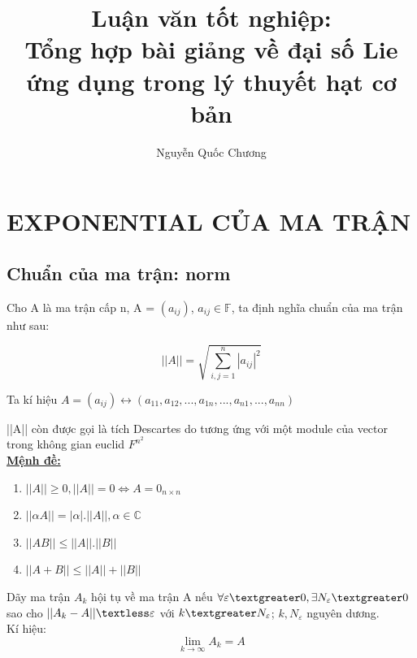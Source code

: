 \documentclass{report}
\title{\textbf{Luận văn tốt nghiệp:\\Tổng hợp bài giảng về đại số Lie ứng dụng trong lý thuyết hạt cơ bản}}
\author{Nguyễn Quốc Chương}
\begin{document}

\begin{titlepage}
		\maketitle
\end{titlepage}

\tableofcontents

\setcounter{page}{1}

\chapter{EXPONENTIAL CỦA MA TRẬN}

\section{Chuẩn của ma trận: norm}
	
Cho A là ma trận cấp n, A = \((a_{ij}) \), \(a_{ij} \in \mathbb{F} \), ta định nghĩa chuẩn của ma trận như sau:

\[ ||A|| = \sqrt{ \sum_{i, j=1}^n |a_{ij}|^{2} } \]

Ta kí hiệu \( A = (a_{ij}) \leftrightarrow ( a_{11}, a_{12}, ..., a_{1n}, ..., a_{n1}, ..., a_{nn} ) \) 

||A|| còn được gọi là tích Descartes do tương ứng với một module của vector trong không gian euclid \( F^{n^{2}} \)\\

\textbf{\underline{Mệnh đề:}}

	\begin{enumerate}
 		\item \( ||A|| \geq 0, ||A|| = 0 \Leftrightarrow A = 0_{n \times n} \)
 		\item \( ||\alpha A|| = |\alpha |.||A||, \alpha \in \mathbb{C} \)
 		\item \( ||AB|| \leq ||A||.||B|| \)
 		\item \( ||A + B|| \leq ||A|| + ||B|| \)
	\end{enumerate}

Dãy ma trận \( A_{k} \) hội tụ về ma trận A nếu \( \forall \varepsilon \textgreater 0, \exists N_{ \varepsilon } \textgreater 0 \) sao cho \( || A_{k} - A || \textless \varepsilon \) với \( k \textgreater N_{ \varepsilon}\);  \(k, N_{\varepsilon} \) nguyên dương.\\

Kí hiệu: \[ \lim_{k \to \infty} A_{k} = A \] 
\end{document}
